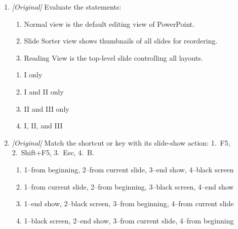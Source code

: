 \documentclass[11pt]{article}
\begin{document}
\begin{enumerate}[label=\textbf{Q\arabic*.}, leftmargin=*]
\begin{enumerate}[label=\Alph*.]
    \item Handouts are the speaker's hidden reminders shown in Presenter View.
  \end{enumerate}
\item \textit{[Original]} Evaluate the statements:
  \begin{enumerate}[label=\Roman*.]
    \item Normal view is the default editing view of PowerPoint.
    \item Slide Sorter view shows thumbnails of all slides for reordering.
    \item Reading View is the top-level slide controlling all layouts.
  \end{enumerate}
  \begin{enumerate}[label=\Alph*.]
    \item I only
    \item I and II only
    \item II and III only
    \item I, II, and III
  \end{enumerate}
\item \textit{[Original]} Match the shortcut or key with its slide-show
  action: 1.~F5, 2.~Shift+F5, 3.~Esc, 4.~B.
  \begin{enumerate}[label=\Alph*.]
    \item 1--from beginning, 2--from current slide, 3--end show, 4--black screen
    \item 1--from current slide, 2--from beginning, 3--black screen, 4--end show
    \item 1--end show, 2--black screen, 3--from beginning, 4--from current slide
    \item 1--black screen, 2--end show, 3--from current slide, 4--from beginning
  \end{enumerate}


\end{enumerate}
\end{document}

